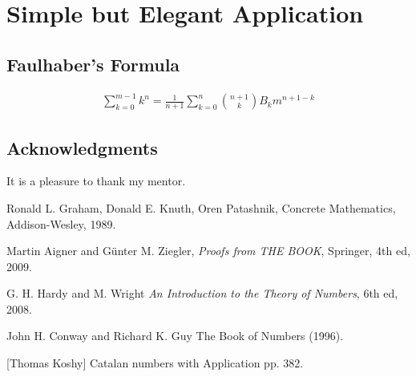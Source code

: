 \documentclass{article}
\theoremstyle{definition}
\begin{document}
\section{Simple but Elegant Application}
\subsection{Faulhaber's Formula}

\begin{align}
\sum_{k=0}^{m-1}k^n=\frac{1}{n+1}\sum_{k=0}^{n}\binom{n+1}{k}B_k m^{n+1-k}
\end{align}

\subsection*{Acknowledgments}  It is a pleasure to thank my mentor.

\begin{thebibliography}{9}

Ronald L. Graham, Donald E. Knuth, Oren Patashnik, Concrete Mathematics, Addison-Wesley, 1989.

Martin Aigner and G\"{u}nter M. Ziegler,
\emph{Proofs from THE BOOK}, Springer, 4th ed, 2009.

G. H. Hardy and M. Wright
\emph{An Introduction to  the  Theory of Numbers},
6th ed, 2008.

John H. Conway and Richard K. Guy
The Book of Numbers (1996).

\label{koshy}
[Thomas Koshy] Catalan numbers with Application pp. 382.

\end{thebibliography}
\end{document}
